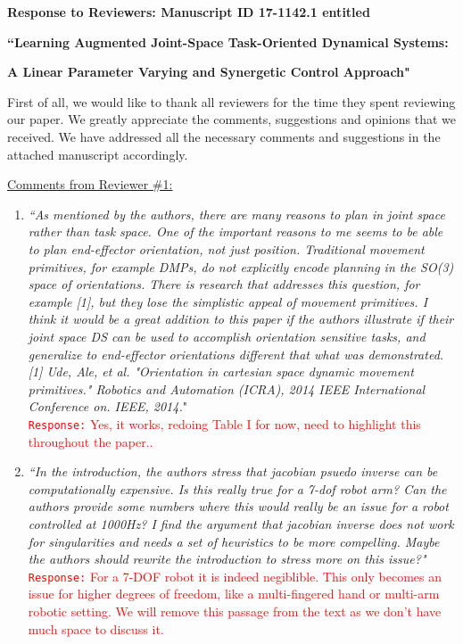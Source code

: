 \documentclass[10pt,stdletter,dateno]{newlfm}
\begin{document}
\begin{newlfm}
\vspace{-2in}
\centerline{\textbf{Response to Reviewers: Manuscript ID 17-1142.1 entitled}} \centerline{\textbf{``Learning Augmented Joint-Space Task-Oriented Dynamical Systems:}}
\centerline{\textbf{A Linear Parameter Varying and Synergetic Control Approach" }}
First of all, we would like to thank all reviewers for the time they spent reviewing our paper. We greatly appreciate the comments, suggestions and opinions that we received. We have addressed all the necessary comments and suggestions in the attached manuscript accordingly. 

\underline{Comments from Reviewer \#1:}
\begin{enumerate}
\item \textit{``As mentioned by the authors, there are many reasons to plan in joint
space rather than task space. One of the important reasons to me seems
to be able to plan end-effector orientation, not just position.
Traditional movement primitives, for example DMPs, do not explicitly
encode planning in the SO(3) space of orientations. There is research
that addresses this question, for example [1], but they lose the
simplistic appeal of movement primitives. I think it would be a great
addition to this paper if the authors illustrate if their joint space
DS can be used to accomplish orientation sensitive tasks, and
generalize to end-effector orientations different that what was
demonstrated.[1] Ude, Ale, et al. "Orientation in cartesian space dynamic movement
primitives." Robotics and Automation (ICRA), 2014 IEEE International
Conference on. IEEE, 2014.}"\\
\textcolor{red}{\texttt{Response:} \small Yes, it works, redoing Table I for now, need to highlight this throughout the paper..}\\

\item \textit{``In the introduction, the authors stress that jacobian psuedo inverse
can be computationally expensive. Is this really true for a 7-dof robot
arm? Can the authors provide some numbers where this would really be an
issue for a robot controlled at 1000Hz? I find the argument that
jacobian inverse does not work for singularities and needs a set of
heuristics to be more compelling. Maybe the authors should rewrite the
introduction to stress more on this issue?"}\\
\textcolor{red}{\texttt{Response:} \small For a 7-DOF robot it is indeed negiblible. This only becomes an issue for higher degrees of freedom, like a multi-fingered hand or multi-arm robotic setting. We will remove this passage from the text as we don't have much space to discuss it.}\\


\end{enumerate}
\end{newlfm}
\end{document}
